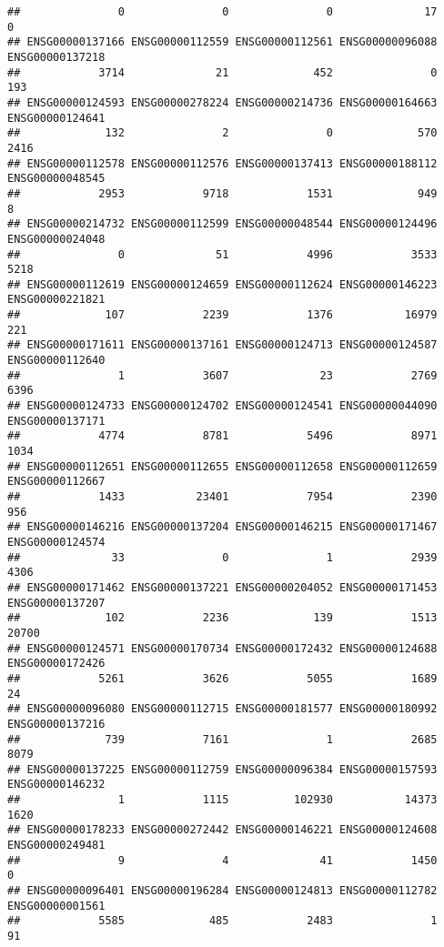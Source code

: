 \documentclass[
]{article}
\begin{document}
\begin{verbatim}
##               0               0               0              17               0 
## ENSG00000137166 ENSG00000112559 ENSG00000112561 ENSG00000096088 ENSG00000137218 
##            3714              21             452               0             193 
## ENSG00000124593 ENSG00000278224 ENSG00000214736 ENSG00000164663 ENSG00000124641 
##             132               2               0             570            2416 
## ENSG00000112578 ENSG00000112576 ENSG00000137413 ENSG00000188112 ENSG00000048545 
##            2953            9718            1531             949               8 
## ENSG00000214732 ENSG00000112599 ENSG00000048544 ENSG00000124496 ENSG00000024048 
##               0              51            4996            3533            5218 
## ENSG00000112619 ENSG00000124659 ENSG00000112624 ENSG00000146223 ENSG00000221821 
##             107            2239            1376           16979             221 
## ENSG00000171611 ENSG00000137161 ENSG00000124713 ENSG00000124587 ENSG00000112640 
##               1            3607              23            2769            6396 
## ENSG00000124733 ENSG00000124702 ENSG00000124541 ENSG00000044090 ENSG00000137171 
##            4774            8781            5496            8971            1034 
## ENSG00000112651 ENSG00000112655 ENSG00000112658 ENSG00000112659 ENSG00000112667 
##            1433           23401            7954            2390             956 
## ENSG00000146216 ENSG00000137204 ENSG00000146215 ENSG00000171467 ENSG00000124574 
##              33               0               1            2939            4306 
## ENSG00000171462 ENSG00000137221 ENSG00000204052 ENSG00000171453 ENSG00000137207 
##             102            2236             139            1513           20700 
## ENSG00000124571 ENSG00000170734 ENSG00000172432 ENSG00000124688 ENSG00000172426 
##            5261            3626            5055            1689              24 
## ENSG00000096080 ENSG00000112715 ENSG00000181577 ENSG00000180992 ENSG00000137216 
##             739            7161               1            2685            8079 
## ENSG00000137225 ENSG00000112759 ENSG00000096384 ENSG00000157593 ENSG00000146232 
##               1            1115          102930           14373            1620 
## ENSG00000178233 ENSG00000272442 ENSG00000146221 ENSG00000124608 ENSG00000249481 
##               9               4              41            1450               0 
## ENSG00000096401 ENSG00000196284 ENSG00000124813 ENSG00000112782 ENSG00000001561 
##            5585             485            2483               1              91 

\end{verbatim}
\end{document}
